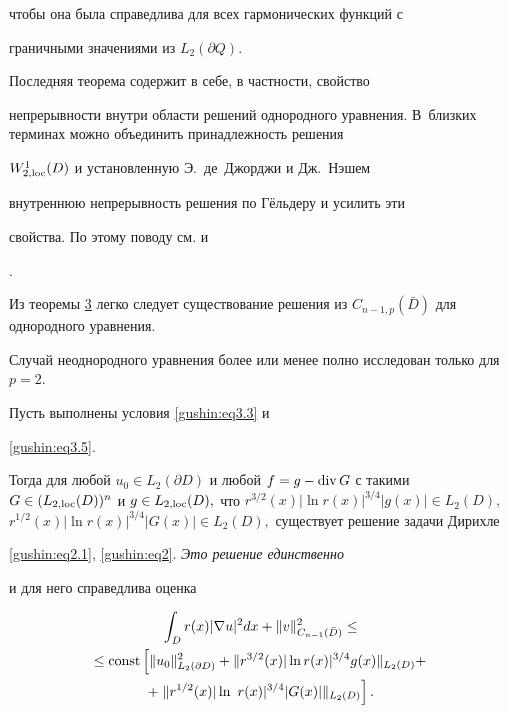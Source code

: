 чтобы она была справедлива для всех гармонических функций с

граничными значениями из $L_2(\partial Q)$.



Последняя теорема содержит в себе, в частности, свойство

непрерывности внутри области решений однородного уравнения. В~близких терминах можно объединить принадлежность решения

${W_{2,{\rm loc}}^1(D)}$ и установленную Э.~де~Джорджи и Дж.~Нэшем

внутреннюю непрерывность решения по Гёльдеру и усилить эти

свойства. По этому поводу см. \cite{gushin:GSM05} и

\cite{gushin:G08}.



Из теоремы \hyperlink{dush:th3}{3} легко следует существование решения из $C_{n-1,

p}(\bar{D})$ для однородного уравнения. 

Случай неоднородного уравнения более или менее полно исследован только для $p = 2$.









\smallskip



\begin{theorem}[4]Пусть выполнены условия \eqref{gushin:eq3.3} и

\eqref{gushin:eq3.5}$.$ 

Тогда для любой $u_0 \in L_2(\partial D)$ и любой $f = g - \mathop{{\rm div}}G$ с такими $G \in (L_{2,{\rm

loc}}(D))^n$ и $g \in L_{2,{\rm loc}}(D),$ что $r^{3/2}(x) |\ln

r(x)|^{3/4} |g(x)| \in L_2(D),$ $r^{1/2}(x) |\ln r(x)|^{3/4} |G(x)| \in L_2(D),$ существует решение задачи Дирихле

\rm \eqref{gushin:eq2.1}, \eqref{gushin:eq2}. \it Это решение единственно

и для него справедлива оценка

\begin{multline*}

\int _{D} r(x) |\nabla u|^2 dx + \Vert

v\Vert^2_{C_{n-1}(\bar{D})} \leq \\

\leq {\rm const} \left[\Vert u_0 \Vert^2_{L_2(\partial D)} + \Vert

r^{3/2}(x) |\ln r(x)|^{3/4} g(x)\Vert_{L_2(D)} + \right.\\

+\left. \Vert r^{1/2}(x) |\ln~r(x)|^{3/4}

|G(x)|\Vert_{L_2(D)}\right].

\end{multline*}

\end{theorem}





